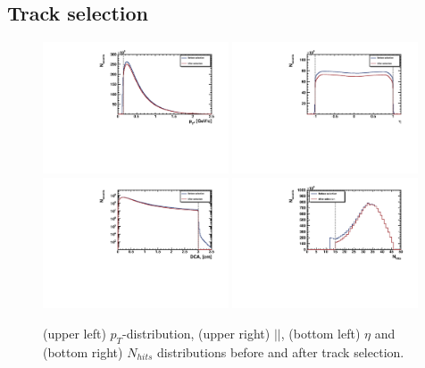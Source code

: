 \FloatBarrier
\subsection {Track selection}

\begin{figure}[ht]
    \begin{multicols}{2}
        \hfill
        \includegraphics[width=0.49\textwidth]{Figures/Pt.pdf}
        \hfill
        \includegraphics[width=0.49\textwidth]{Figures/Eta.pdf}
        \hfill
        \includegraphics[width=0.49\textwidth]{Figures/DCA.pdf}
        \hfill
        \includegraphics[width=0.49\textwidth]{Figures/Nhits.pdf}
    \end{multicols}
    \label{fig:TrackSelection}
    \caption{(upper left) $p_T$-distribution, (upper right) $|$\DCA$|$, (bottom left) $\eta$ and (bottom right) $N_{hits}$ distributions before and after track selection.}
\end{figure}

